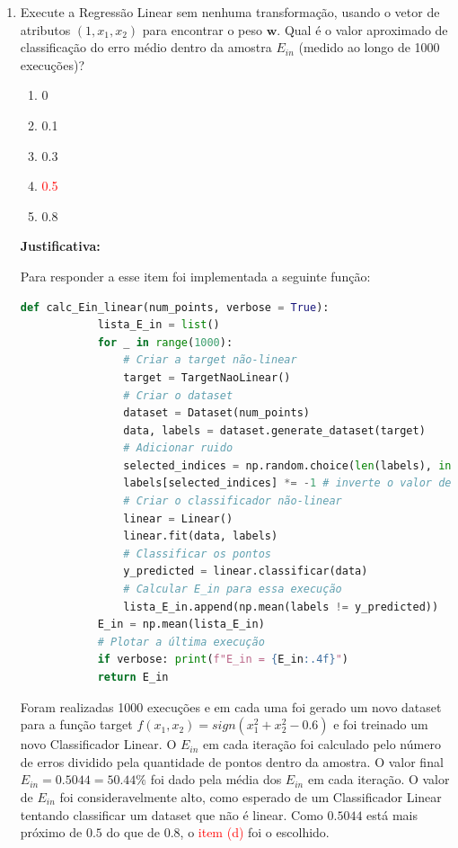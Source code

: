 \begin{enumerate}
    \item Execute a Regressão Linear sem nenhuma transformação, usando o vetor de atributos $(1, x_1, x_2)$ para encontrar o peso $\boldsymbol{w}$. Qual é o valor aproximado de classificação do erro médio dentro da amostra $E_{in}$ (medido ao longo de 1000 execuções)?
    
    \begin{enumerate}
        \item 0
        \item 0.1
        \item 0.3
        \item [\textcolor{red}{(d)}]\textcolor{red}{0.5}\addtocounter{enumii}{1}
        \item 0.8
    \end{enumerate}
    
    \par

    \textbf{Justificativa:}

    Para responder a esse item foi implementada a seguinte função:

    \begin{lstlisting}[language=Python, caption=Cálculo do E\_in para a Regressão Linear, label=cod:calc_E_in_linear]
        def calc_Ein_linear(num_points, verbose = True):
            lista_E_in = list()
            for _ in range(1000):
                # Criar a target não-linear
                target = TargetNaoLinear()
                # Criar o dataset
                dataset = Dataset(num_points)
                data, labels = dataset.generate_dataset(target)
                # Adicionar ruido
                selected_indices = np.random.choice(len(labels), int(len(labels) * 0.1), replace=False) # seleciona 10%
                labels[selected_indices] *= -1 # inverte o valor de 10%
                # Criar o classificador não-linear
                linear = Linear()
                linear.fit(data, labels)
                # Classificar os pontos
                y_predicted = linear.classificar(data)
                # Calcular E_in para essa execução
                lista_E_in.append(np.mean(labels != y_predicted))
            E_in = np.mean(lista_E_in)
            # Plotar a última execução
            if verbose: print(f"E_in = {E_in:.4f}")
            return E_in
    \end{lstlisting}

    Foram realizadas 1000 execuções e em cada uma foi gerado um novo dataset para a função target $f(x_1,x_2) = sign(x_1^2 + x_2^2 - 0.6) $ e foi treinado um novo Classificador Linear. O $E_{in}$ em cada iteração foi calculado pelo número de erros dividido pela quantidade de pontos dentro da amostra. O valor final $E_{in} = 0.5044 = 50.44\%$ foi dado pela média dos $E_{in}$ em cada iteração. O valor de $E_{in}$ foi consideravelmente alto, como esperado de um Classificador Linear tentando classificar um dataset que não é linear. Como $0.5044$ está mais próximo de $0.5$ do que de $0.8$, o \textcolor{red}{item (d)} foi o escolhido.


\end{enumerate}
